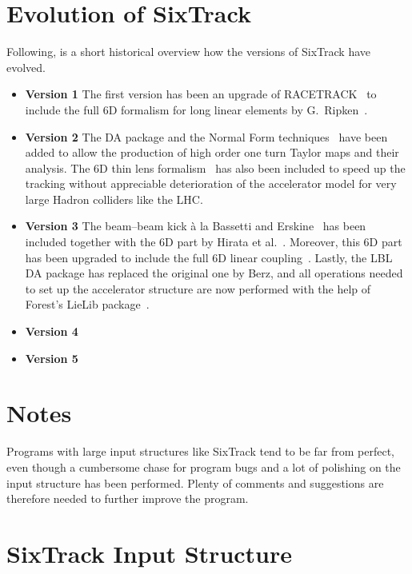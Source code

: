 \section{Evolution of SixTrack}

Following, is a short historical overview how the versions of SixTrack have evolved.
\begin{itemize}
  \item {\bf Version 1}
        The first version has been an upgrade of RACETRACK~\cite{RACETRACK} to include the full 6D formalism for long linear elements by G.~Ripken~\cite{Ripken85}.
  \item {\bf Version 2}
        The DA package and the Normal Form techniques~\cite{Berz89,Forest89} have been added to allow the production of high order one turn Taylor maps and their analysis.
        The 6D thin lens formalism~\cite{Ripken95} has also been included to speed up the tracking without appreciable deterioration of the accelerator model for very large Hadron colliders like the LHC.
  \item {\bf Version 3}
        The beam--beam kick \`a la Bassetti and Erskine~\cite{BasErs} has been included together with the 6D part by Hirata et al.~\cite{Hirata}.
        Moreover, this 6D part has been upgraded to include the full 6D linear coupling~\cite{ripbeam}.
        Lastly, the LBL DA package has replaced the original one by Berz, and all operations needed to set up the accelerator structure are now performed with the help of Forest's LieLib package~\cite{DALIE}.
  \item {\bf Version 4}
  \item {\bf Version 5}
\end{itemize}

\section{Notes}
Programs with large input structures like SixTrack tend to be far from perfect, even though a cumbersome chase for program bugs and a lot of polishing on the input structure has been performed.
Plenty of comments and suggestions are therefore needed to further improve the program.

\section{SixTrack Input Structure}

